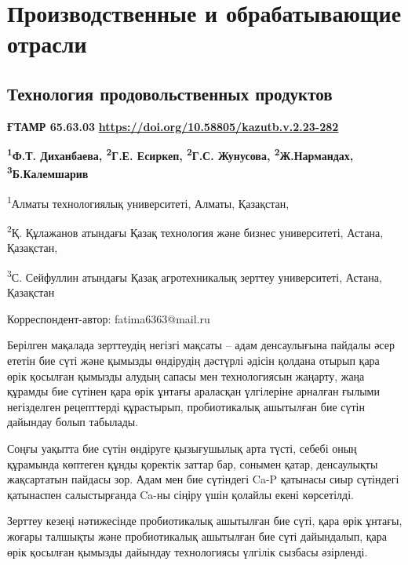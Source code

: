 \newpage
\let\cleardoublepage\clearpage
\part{Производственные и обрабатывающие отрасли}
\chapter{Технология продовольственных продуктов}

{\bfseries ҒТАМР 65.63.03}
\hfill {\bfseries \href{https://doi.org/10.58805/kazutb.v.2.23-282}{https://doi.org/10.58805/kazutb.v.2.23-282}}


\begin{center}
{\bfseries \textsuperscript{1}Ф.Т. Диханбаева\envelope, \textsuperscript{2}Г.Е. Есиркеп, \textsuperscript{2}Г.С. Жунусова, \textsuperscript{2}Ж.Нармандах, \textsuperscript{3}Б.Калемшарив}

\textsuperscript{1}Алматы технологиялық университеті, Алматы, Қазақстан,

\textsuperscript{2}Қ. Құлажанов атындағы Қазақ технология және бизнес
университеті, Астана, Қазақстан,

\textsuperscript{3}С. Сейфуллин атындағы Қазақ агротехникалық зерттеу
университеті, Астана, Қазақстан

\envelope Корреспондент-автор: fatima6363@mail.ru
\end{center}

Берілген мақалада зерттеудің негізгі мақсаты -- адам денсаулығына
пайдалы әсер ететін бие сүті және қымызды өндірудің дәстүрлі әдісін
қолдана отырып қара өрік қосылған қымызды алудың сапасы мен
технологиясын жаңарту, жаңа құрамды бие сүтінен қара өрік ұнтағы
араласқан үлгілеріне арналған ғылыми негізделген рецепттерді құрастырып,
пробиотикалық ашытылған бие сүтін дайындау болып табылады.

Соңғы уақытта бие сүтін өндіруге қызығушылық арта түсті, себебі оның
құрамында көптеген құнды қоректік заттар бар, сонымен қатар, денсаулықты
жақсартатын пайдасы зор. Адам мен бие сүтіндегі Ca-P қатынасы сиыр
сүтіндегі қатынаспен салыстырғанда Ca-ны сіңіру үшін қолайлы екені
көрсетілді.

Зерттеу кезеңі нәтижесінде пробиотикалық ашытылған бие сүті, қара өрік
ұнтағы, жоғары талшықты және пробиотикалық ашытылған бие сүті
дайындалып, қара өрік қосылған қымызды дайындау технологиясы үлгілік
сызбасы әзірленді.

